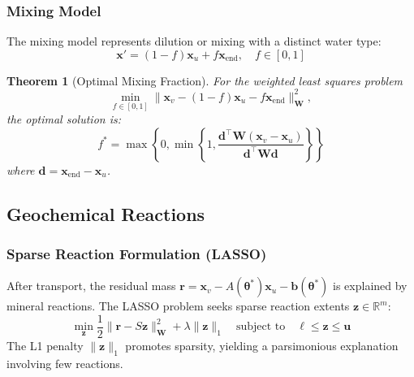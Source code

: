 \documentclass[12pt,a4paper]{article}
\theoremstyle{plain}
\newtheorem{theorem}{Theorem}[section]
\theoremstyle{definition}
\theoremstyle{remark}
\begin{document}
\subsubsection{Mixing Model}
The mixing model represents dilution or mixing with a distinct water type:
\begin{equation}\label{eq:mixing}
	\mathbf{x}' = (1-f) \mathbf{x}_u + f \mathbf{x}_{\text{end}}, \quad f \in [0, 1]
\end{equation}
\begin{theorem}[Optimal Mixing Fraction]\label{thm:mixing_optimal}
	For the weighted least squares problem
	\[\min_{f \in [0,1]} \|\mathbf{x}_v - (1-f)\mathbf{x}_u - f\mathbf{x}_{\text{end}}\|_{\mathbf{W}}^2,\]
	the optimal solution is:
	\begin{equation}\label{eq:f_optimal}
		f^* = \max\left\{0, \min\left\{1, \frac{\mathbf{d}^\top \mathbf{W} (\mathbf{x}_v - \mathbf{x}_u)}{\mathbf{d}^\top \mathbf{W} \mathbf{d}}\right\}\right\}
	\end{equation}
	where $\mathbf{d} = \mathbf{x}_{\text{end}} - \mathbf{x}_u$.
\end{theorem}

\subsection{Geochemical Reactions}\label{sec:geochemical_reactions}

\subsubsection{Sparse Reaction Formulation (LASSO)}
After transport, the residual mass $\mathbf{r} = \mathbf{x}_v - A(\boldsymbol{\theta}^*)\mathbf{x}_u - \mathbf{b}(\boldsymbol{\theta}^*)$ is explained by mineral reactions. The LASSO problem seeks sparse reaction extents $\mathbf{z} \in \mathbb{R}^m$:
\begin{equation}\label{eq:lasso}
	\min_{\mathbf{z}} \frac{1}{2} \|\mathbf{r} - S\mathbf{z}\|_{\mathbf{W}}^2 + \lambda \|\mathbf{z}\|_1 \quad \text{subject to} \quad \boldsymbol{\ell} \leq \mathbf{z} \leq \mathbf{u}
\end{equation}
The L1 penalty $\|\mathbf{z}\|_1$ promotes sparsity, yielding a parsimonious explanation involving few reactions.
\end{document}
